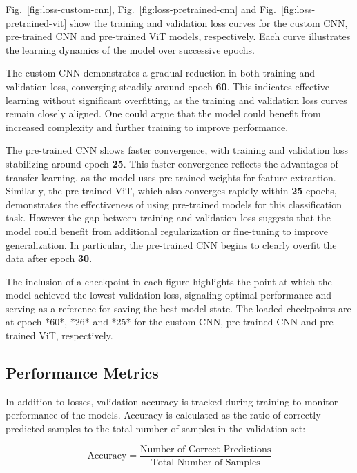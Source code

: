 Fig.~\ref{fig:loss-custom-cnn}, Fig.~\ref{fig:loss-pretrained-cnn} and Fig.~\ref{fig:loss-pretrained-vit} show the training and validation loss curves for the custom CNN, pre-trained CNN and pre-trained ViT models, respectively. Each curve illustrates the learning dynamics of the model over successive epochs.

The custom CNN demonstrates a gradual reduction in both training and validation loss, converging steadily around epoch \textbf{60}. This indicates effective learning without significant overfitting, as the training and validation loss curves remain closely aligned. One could argue that the model could benefit from increased complexity and further training to improve performance.

The pre-trained CNN shows faster convergence, with training and validation loss stabilizing around epoch \textbf{25}. This faster convergence reflects the advantages of transfer learning, as the model uses pre-trained weights for feature extraction. Similarly, the pre-trained ViT, which also converges rapidly within \textbf{25} epochs, demonstrates the effectiveness of using pre-trained models for this classification task. However the gap between training and validation loss suggests that the model could benefit from additional regularization or fine-tuning to improve generalization. In particular, the pre-trained CNN begins to clearly overfit the data after epoch \textbf{30}.

The inclusion of a checkpoint in each figure highlights the point at which the model achieved the lowest validation loss, signaling optimal performance and serving as a reference for saving the best model state. The loaded checkpoints are at epoch *60*, *26* and *25* for the custom CNN, pre-trained CNN and pre-trained ViT, respectively.

\subsection{Performance Metrics}

In addition to losses, validation accuracy is tracked during training to monitor performance of the models. Accuracy is calculated as the ratio of correctly predicted samples to the total number of samples in the validation set:

\begin{equation}
    \text{Accuracy} = \frac{\text{Number of Correct Predictions}}{\text{Total Number of Samples}}\label{eq:accuracy}
\end{equation}

